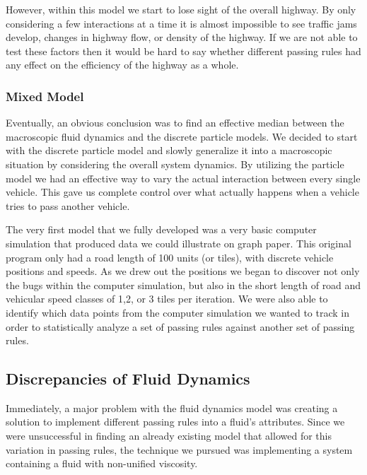 \documentclass{amsart}
\begin{document}
	However, within this model we start to lose sight of the overall highway. By only considering a few interactions at a time it is almost impossible to see traffic jams develop, changes in highway flow, or density of the highway. If we are not able to test these factors then it would be hard to say whether different passing rules had any effect on the efficiency of the highway as a whole.
		
		\subsubsection{Mixed Model}
		
	Eventually, an obvious conclusion was to find an effective median between the macroscopic fluid dynamics and the discrete particle models. We decided to start with the discrete particle model and slowly generalize it into a macroscopic situation by considering the overall system dynamics. By utilizing the particle model we had an effective way to vary the actual interaction between every single vehicle. This gave us complete control over what actually happens when a vehicle tries to pass another vehicle. 
	
	The very first model that we fully developed was a very basic computer simulation that produced data we could illustrate on graph paper. This original program only had a road length of 100 units (or tiles), with discrete vehicle positions and speeds. As we drew out the positions we began to discover not only the bugs within the computer simulation, but also in the short length of road and vehicular speed classes of 1,2, or 3 tiles per iteration. We were also able to identify which data points from the computer simulation we wanted to track in order to statistically analyze a set of passing rules against another set of passing rules.

	\subsection{Discrepancies of Fluid Dynamics}
	Immediately, a major problem with the fluid dynamics model was creating a solution to implement different passing rules into a fluid's attributes. Since we were unsuccessful in finding an already existing model that allowed for this variation in passing rules, the technique we pursued was implementing a system containing a fluid with non-unified viscosity. 
	
\end{document}
